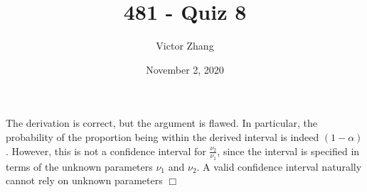 \documentclass{article}
\title{481 - Quiz 8}
\author{Victor Zhang}
\date{November 2, 2020}
\begin{document}
\maketitle

\section{}
The derivation is correct, but the argument is flawed. In particular, the probability of the proportion being within the derived interval is indeed $(1-\alpha)$. However, this is not a confidence interval for $\frac{\nu_2}{\nu_1}$, since the interval is specified in terms of the unknown parameters $\nu_1$ and $\nu_2$. A valid confidence interval naturally cannot rely on unknown parameters $\Box$
\end{document}
